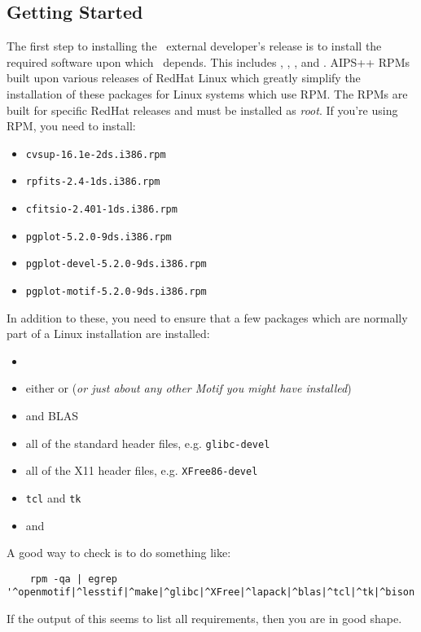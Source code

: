 \subsection{Getting Started}
\label{developer release setting up}

The first step to installing the \aipspp\ external developer's release is to
install the required software upon which \aipspp\ depends. This includes
,
,
, and
. AIPS++
RPMs built upon various releases of RedHat Linux which greatly simplify the installation
of these packages for Linux systems which use RPM. The RPMs are built for specific
RedHat releases and must be installed as {\em root}. If you're using RPM, you need to
install:
\begin{itemize}
\item \verb+cvsup-16.1e-2ds.i386.rpm+
\item \verb+rpfits-2.4-1ds.i386.rpm+
\item \verb+cfitsio-2.401-1ds.i386.rpm+
\item \verb+pgplot-5.2.0-9ds.i386.rpm+
\item \verb+pgplot-devel-5.2.0-9ds.i386.rpm+
\item \verb+pgplot-motif-5.2.0-9ds.i386.rpm+
\end{itemize}
In addition to these, you need to ensure that a few packages which are normally
part of a Linux installation are installed:
\begin{itemize}
\item {}
\item either  or
       ({\em or just about any
      other Motif you might have installed})
\item {} and BLAS
\item all of the standard header files, e.g. \verb+glibc-devel+
\item all of the X11 header files, e.g. \verb+XFree86-devel+
\item \verb+tcl+ and \verb+tk+
\item {} and
\end{itemize}
A good way to check is to do something like:
\begin{verbatim}
    rpm -qa | egrep '^openmotif|^lesstif|^make|^glibc|^XFree|^lapack|^blas|^tcl|^tk|^bison|^flex'
\end{verbatim}
If the output of this seems to list all requirements, then you are in good shape.


